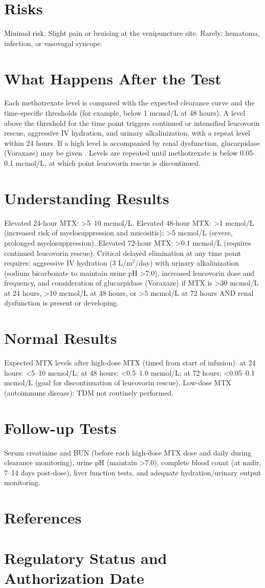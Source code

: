 \section*{Risks}
Minimal risk. Slight pain or bruising at the venipuncture site. Rarely: hematoma, infection, or vasovagal syncope.
\section*{What Happens After the Test}
Each methotrexate level is compared with the expected clearance curve and the time-specific thresholds (for example, below 1 mcmol/L at 48 hours). A level above the threshold for the time point triggers continued or intensified leucovorin rescue, aggressive IV hydration, and urinary alkalinization, with a repeat level within 24 hours. If a high level is accompanied by renal dysfunction, glucarpidase (Voraxaze) may be given \cite{widemann2006understanding}. Levels are repeated until methotrexate is below 0.05--0.1 mcmol/L, at which point leucovorin rescue is discontinued.
\section*{Understanding Results}
Elevated 24-hour MTX: >5--10 mcmol/L. Elevated 48-hour MTX: >1 mcmol/L (increased risk of myelosuppression and mucositis); >5 mcmol/L (severe, prolonged myelosuppression). Elevated 72-hour MTX: >0.1 mcmol/L (requires continued leucovorin rescue). Critical delayed elimination at any time point requires: aggressive IV hydration (3 L/m$^2$/day) with urinary alkalinization (sodium bicarbonate to maintain urine pH >7.0), increased leucovorin dose and frequency, and consideration of glucarpidase (Voraxaze) if MTX is >30 mcmol/L at 24 hours, >10 mcmol/L at 48 hours, or >5 mcmol/L at 72 hours AND renal dysfunction is present or developing.
\section*{Normal Results}
Expected MTX levels after high-dose MTX (timed from start of infusion): at 24 hours: <5--10 mcmol/L; at 48 hours: <0.5--1.0 mcmol/L; at 72 hours: <0.05--0.1 mcmol/L (goal for discontinuation of leucovorin rescue). Low-dose MTX (autoimmune disease): TDM not routinely performed.
\section*{Follow-up Tests}
Serum creatinine and BUN (before each high-dose MTX dose and daily during clearance monitoring), urine pH (maintain >7.0), complete blood count (at nadir, 7--14 days post-dose), liver function tests, and adequate hydration/urinary output monitoring.
\section*{References}



\clearpage
\section*{Regulatory Status and Authorization Date}

\clearpage

